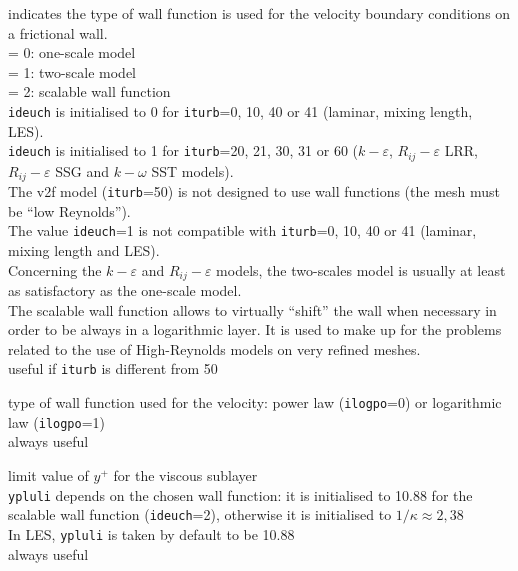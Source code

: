 {indicates the type of wall function is used for
 the velocity boundary conditions on a frictional wall.\\
\hspace*{1.3cm}= 0: one-scale model\\
\hspace*{1.3cm}= 1: two-scale model\\
\hspace*{1.3cm}= 2: scalable wall function\\
{\tt ideuch} is initialised to 0 for {\tt iturb}=0, 10, 40 or 41
(laminar, mixing length, LES).\\
{\tt ideuch} is initialised to 1 for {\tt iturb}=20, 21, 30, 31 or 60
($k-\varepsilon$, $R_{ij}-\varepsilon$ LRR, $R_{ij}-\varepsilon$ SSG and
$k-\omega$ SST models).\\
The v2f model ({\tt iturb}=50) is not designed to use wall functions
(the mesh must be ``low Reynolds'').\\
The value {\tt ideuch}=1 is not compatible with {\tt iturb}=0, 10, 40
or 41 (laminar, mixing length and LES).\\
Concerning the $k-\varepsilon$ and $R_{ij}-\varepsilon$ models, the
two-scales model is usually at least as satisfactory as the one-scale
model.\\
The scalable wall function allows to virtually ``shift'' the wall when
necessary in order to be always in a logarithmic layer.
It is used to make up for
the problems related to the use of High-Reynolds models on very refined
meshes.\\
useful if {\tt iturb} is different from 50}

{type of wall function used for the velocity: power law
({\tt ilogpo}=0) or logarithmic law ({\tt ilogpo}=1)\\
always useful}

{limit value of $y^+$ for the viscous sublayer\\
{\tt ypluli} depends on the chosen wall function: it is
initialised to 10.88 for the scalable wall function ({\tt ideuch}=2),
otherwise it is initialised to $1/\kappa\approx 2,38$\\
In LES, {\tt ypluli} is taken by default to be 10.88\\
always useful}


